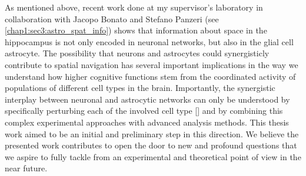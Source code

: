 As mentioned above, recent work done at my supervisor's laboratory in collaboration with Jacopo Bonato and Stefano Panzeri (see \ref{chap1:sec3:astro_spat_info}) shows that information about space in the hippocampus is not only encoded in neuronal networks, but also in the glial cell astrocyte.
The possibility that neurons and astrocytes could synergisticly contribute to spatial navigation has several important implications in the way we understand how higher cognitive functions stem from the coordinated activity of populations of different cell types in the brain. 
Importantly, the synergistic interplay between neuronal and astrocytic networks can only be understood by specifically perturbing each of the involved cell type [\cite{panzeri2017cracking}] and by combining this complex experimental approaches with advanced analysis methods. 
This thesis work aimed to be an initial and preliminary step in this direction. 
We believe the presented work contributes to open the door to new and profound questions that we aspire to fully tackle from an experimental and theoretical point of view in the near future. 








